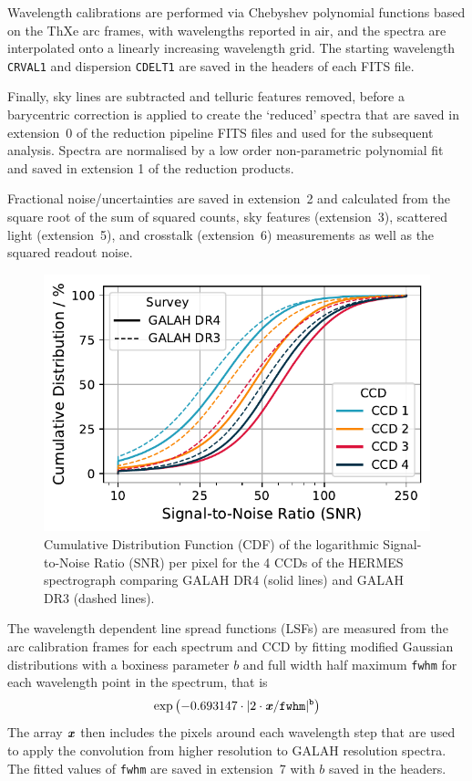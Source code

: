 \documentclass[
  journal=pasa,
  manuscript=research-paper, %
  year=2024,
  volume=37
]{cup-journal}
\begin{document}
Wavelength calibrations are performed via Chebyshev polynomial functions based on the ThXe arc frames, with wavelengths reported in air, and the spectra are interpolated onto a linearly increasing wavelength grid. The starting wavelength \texttt{CRVAL1} and dispersion \texttt{CDELT1} are saved in the headers of each FITS file.

Finally, sky lines are subtracted and telluric features removed, before a barycentric correction is applied to create the `reduced' spectra that are saved in extension~0 of the reduction pipeline FITS files and used for the subsequent analysis. Spectra are normalised by a low order non-parametric polynomial fit and saved in extension 1 of the reduction products.

Fractional noise/uncertainties are saved in extension~2 and calculated from the square root of the sum of squared counts, sky features (extension~3), scattered light (extension~5), and crosstalk (extension~6) measurements as well as the squared readout noise.

\begin{figure}[ht]
    \centering
    \includegraphics[width=\columnwidth]{figures/snr_distribution.pdf}
    \caption{Cumulative Distribution Function (CDF) of the logarithmic Signal-to-Noise Ratio (SNR) per pixel for the 4 CCDs of the HERMES spectrograph comparing GALAH DR4 (solid lines) and GALAH DR3 (dashed lines).}
    \label{fig:snr_distribution}
\end{figure}

The wavelength dependent line spread functions (LSFs) are measured from the arc calibration frames for each spectrum and CCD by fitting modified Gaussian distributions with a boxiness parameter $b$ and full width half maximum \texttt{fwhm} for each wavelength point in the spectrum, that is
\begin{align}
    \exp \left(-0.693147 \cdot \vert 2 \cdot \textbf{\textit{x}}/\texttt{fwhm} \vert^\texttt{b}\right) \label{eq:lsf}
\end{align}
The array $\textbf{\textit{x}}$ then includes the pixels around each wavelength step that are used to apply the convolution from higher resolution to GALAH resolution spectra. The fitted values of \texttt{fwhm} are saved in extension~7 with $b$ saved in the headers.
\end{document}
